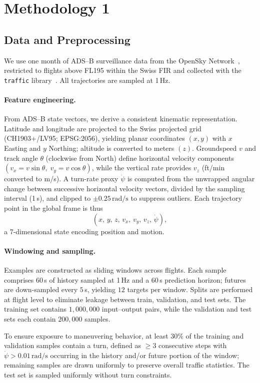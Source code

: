 \documentclass[
  manuscript=proceedings,  %
  layout=preprint,  %
  year=20xx,
  volume=x,
]{extra/joas}
\begin{document}
\section{Methodology 1}

\subsection{Data and Preprocessing}

We use one month of ADS--B surveillance data from the OpenSky Network~\cite{Schaefer_etal_2014}, restricted to flights above FL195 within the Swiss FIR and collected with the \texttt{traffic} library~\cite{Olive_2019}. All trajectories are sampled at 1\,Hz.

\paragraph{Feature engineering.}
From ADS--B state vectors, we derive a consistent kinematic representation. Latitude and longitude are projected to the Swiss projected grid (CH1903{+}/LV95; EPSG:2056), yielding planar coordinates $(x,y)$ with $x$ Easting and $y$ Northing; altitude is converted to meters $(z)$. Groundspeed $v$ and track angle $\theta$ (clockwise from North) define horizontal velocity components $(v_x = v\sin\theta,\; v_y = v\cos\theta)$, while the vertical rate provides $v_z$ (ft/min converted to m/s). A turn-rate proxy $\dot{\psi}$ is computed from the unwrapped angular change between successive horizontal velocity vectors, divided by the sampling interval (1\,s), and clipped to $\pm 0.25\,\text{rad/s}$ to suppress outliers. Each trajectory point in the global frame is thus
\[
(x,\, y,\, z,\, v_x,\, v_y,\, v_z,\, \dot{\psi}),
\]
a 7-dimensional state encoding position and motion.

\paragraph{Windowing and sampling.}
Examples are constructed as sliding windows across flights. Each sample comprises $60$\,s of history sampled at 1\,Hz and a $60$\,s prediction horizon; futures are down-sampled every $5$\,s, yielding $12$ targets per window. Splits are performed at flight level to eliminate leakage between train, validation, and test sets. The training set contains $1{,}000{,}000$ input--output pairs, while the validation and test sets each contain $200{,}000$ samples.

To ensure exposure to maneuvering behavior, at least $30\%$ of the training and validation samples contain a turn, defined as $\geq 3$ consecutive steps with $\dot{\psi} > 0.01\,\text{rad/s}$ occurring in the history and/or future portion of the window; remaining samples are drawn uniformly to preserve overall traffic statistics. The test set is sampled uniformly without turn constraints.
\end{document}
